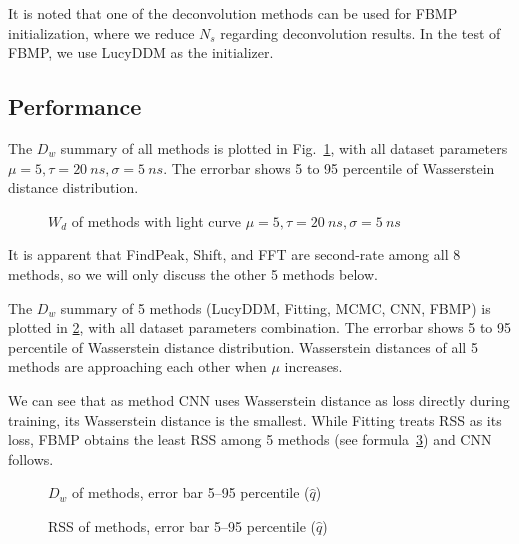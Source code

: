 It is noted that one of the deconvolution methods can be used for FBMP initialization, where we reduce $N_s$ regarding deconvolution results. In the test of FBMP, we use LucyDDM as the initializer. 

\subsection{Performance}


The $D_w$ summary of all methods is plotted in Fig.~\ref{fig:chargesummary}, with all dataset parameters $\mu=5, \tau=\SI{20}{ns}, \sigma=\SI{5}{ns}$. The errorbar shows 5 to 95 percentile of Wasserstein distance distribution. 

\begin{figure}[H]
    \centering
    \scalebox{0.6}{}
    \caption{\label{fig:chargesummary} $W_{d}$ of methods with light curve $\mu=5, \tau=\SI{20}{ns}, \sigma=\SI{5}{ns}$}
\end{figure}

It is apparent that FindPeak, Shift, and FFT are second-rate among all 8 methods, so we will only discuss the other 5 methods below. 


The $D_w$ summary of 5 methods (LucyDDM, Fitting, MCMC, CNN, FBMP) is plotted in \ref{fig:wdistsummary}, with all dataset parameters combination. The errorbar shows 5 to 95 percentile of Wasserstein distance distribution. Wasserstein distances of all 5 methods are approaching each other when $\mu$ increases. 

We can see that as method CNN uses Wasserstein distance as loss directly during training, its Wasserstein distance is the smallest. While Fitting treats RSS as its loss, FBMP obtains the least RSS among 5 methods (see formula~\ref{fig:rsssummary}) and CNN follows. 
\begin{figure}[H]
    \centering
    \resizebox{\textwidth}{!}{}
    \caption{\label{fig:wdistsummary} $D_w$ of methods, error bar 5--95 percentile ($\hat{q}$)}
\end{figure}

\begin{figure}[H]
    \centering
    \resizebox{\textwidth}{!}{}
    \caption{\label{fig:rsssummary} RSS of methods, error bar 5--95 percentile ($\hat{q}$)}
\end{figure}

